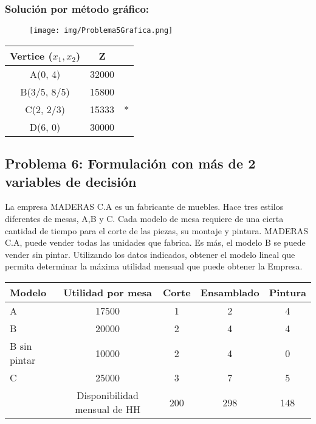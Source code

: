 \documentclass{templateNote}
\begin{document}
\subsubsection*{Solución por método gráfico:}
\begin{figure}[H]
    \centering
    \texttt{[image: img/Problema5Grafica.png]}
\end{figure}

\begin{center}
    \begin{tabular}{|c|c|c|}
        \hline
        \textbf{Vertice ($x_1,x_2$)} & Z &  \\ \hline
        A(0, 4) & 32000 & \\ \hline
        B(3/5, 8/5) & 15800 & \\ \hline
        C(2, 2/3) & 15333 & * \\ \hline
        D(6, 0) & 30000 & \\ \hline
    \end{tabular}
\end{center}

\subsection*{Problema 6: Formulación con más de 2 variables de decisión}
La empresa MADERAS C.A es un fabricante de muebles. Hace tres estilos diferentes de mesas, A,B y C. Cada modelo de mesa requiere de una cierta cantidad de tiempo para el corte de las piezas, su montaje y pintura. MADERAS C.A, puede vender todas las unidades que fabrica. Es más, el modelo B se puede vender sin pintar. Utilizando los datos indicados, obtener el modelo lineal que permita determinar la máxima utilidad mensual que puede obtener la Empresa.

\begin{center}
    \begin{tabular}{|l|c|c|c|c|}
        \hline
        Modelo & Utilidad por mesa & Corte & Ensamblado & Pintura \\ \hline
        A & 17500 & 1 & 2 & 4 \\ \hline
        B & 20000 & 2 & 4 & 4 \\ \hline
        B sin pintar & 10000 & 2 & 4 & 0 \\ \hline
        C & 25000 & 3 & 7 & 5 \\ \hline
         & Disponibilidad mensual de HH & 200 & 298 & 148 \\ \hline
    \end{tabular}
\end{center}
\end{document}
